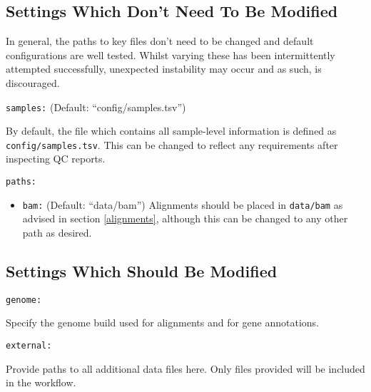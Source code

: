 \documentclass[
]{book}
\providecommand{\tightlist}{%
  \setlength{\itemsep}{0pt}\setlength{\parskip}{0pt}}
\begin{document}
\hypertarget{settings-which-dont-need-to-be-modified}{%
\subsection*{Settings Which Don't Need To Be Modified}\label{settings-which-dont-need-to-be-modified}}

In general, the paths to key files don't need to be changed and default configurations are well tested.
Whilst varying these has been intermittently attempted successfully, unexpected instability may occur and as such, is discouraged.

\texttt{samples:} (Default: ``config/samples.tsv'')

By default, the file which contains all sample-level information is defined as \texttt{config/samples.tsv}.
This can be changed to reflect any requirements after inspecting QC reports.

\texttt{paths:}

\begin{itemize}
\tightlist
\item
  \texttt{bam:} (Default: ``data/bam'') Alignments should be placed in \texttt{data/bam} as advised in section \ref{alignments}, although this can be changed to any other path as desired.
\end{itemize}

\hypertarget{settings-which-should-be-modified}{%
\subsection*{Settings Which Should Be Modified}\label{settings-which-should-be-modified}}

\texttt{genome:}

Specify the genome build used for alignments and for gene annotations.

\texttt{external:}

Provide paths to all additional data files here.
Only files provided will be included in the workflow.
\end{document}
